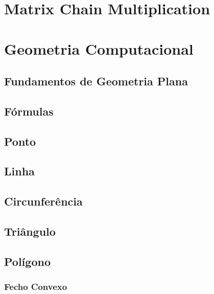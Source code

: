     \section{Matrix Chain Multiplication}
        
        \newpage
    \section{Geometria Computacional}
        \subsection{Fundamentos de Geometria Plana}
            
            \newpage
        \subsection{Fórmulas}
            
            \newpage
        \subsection{Ponto}
            
            \newpage
        \subsection{Linha}
            
            \newpage
        \subsection{Circunferência}
            
            \newpage
        \subsection{Triângulo}
            
            \newpage
        \subsection{Polígono}
            
            \newpage
            \subsubsection{Fecho Convexo}
                
                \newpage
        
